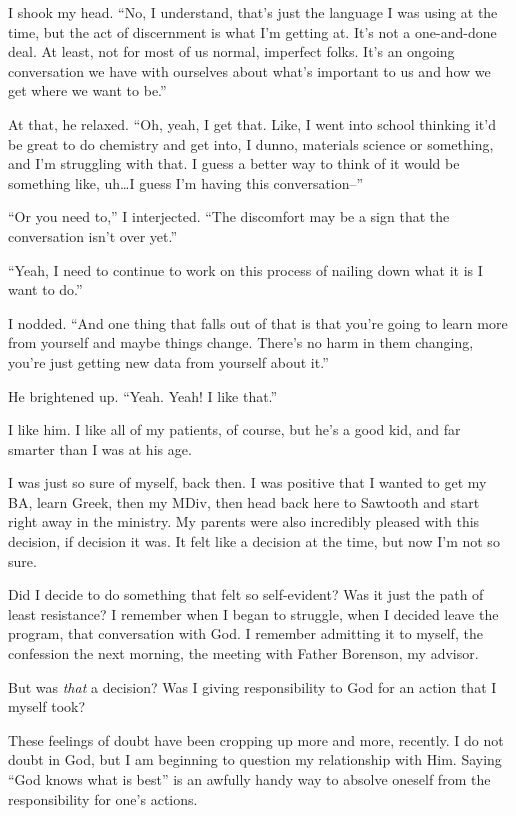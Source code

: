 I shook my head. ``No, I understand, that's just the language I was using at the time, but the act of discernment is what I'm getting at. It's not a one-and-done deal. At least, not for most of us normal, imperfect folks. It's an ongoing conversation we have with ourselves about what's important to us and how we get where we want to be.''

At that, he relaxed. ``Oh, yeah, I get that. Like, I went into school thinking it'd be great to do chemistry and get into, I dunno, materials science or something, and I'm struggling with that. I guess a better way to think of it would be something like, uh\ldots I guess I'm having this conversation--''

``Or you need to,'' I interjected. ``The discomfort may be a sign that the conversation isn't over yet.''

``Yeah, I need to continue to work on this process of nailing down what it is I want to do.''

I nodded. ``And one thing that falls out of that is that you're going to learn more from yourself and maybe things change. There's no harm in them changing, you're just getting new data from yourself about it.''

He brightened up. ``Yeah. Yeah! I like that.''

I like him. I like all of my patients, of course, but he's a good kid, and far smarter than I was at his age.

I was just so sure of myself, back then. I was positive that I wanted to get my BA, learn Greek, then my MDiv, then head back here to Sawtooth and start right away in the ministry. My parents were also incredibly pleased with this decision, if decision it was. It felt like a decision at the time, but now I'm not so sure.

Did I decide to do something that felt so self-evident? Was it just the path of least resistance? I remember when I began to struggle, when I decided leave the program, that conversation with God. I remember admitting it to myself, the confession the next morning, the meeting with Father Borenson, my advisor.

But was \emph{that} a decision? Was I giving responsibility to God for an action that I myself took?

These feelings of doubt have been cropping up more and more, recently. I do not doubt in God, but I am beginning to question my relationship with Him. Saying ``God knows what is best'' is an awfully handy way to absolve oneself from the responsibility for one's actions.

